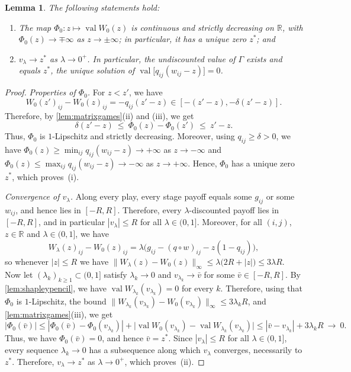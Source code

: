 \documentclass[11pt, a4paper]{article}
\theoremstyle{plain}
\newtheorem{lemma}{Lemma}
\theoremstyle{definition}
\newcommand{\R}{\mathbb{R}}
\DeclareMathOperator{\val}{val}
\begin{document}
\begin{lemma}\label{lem:uniformlimit}
The following statements hold:
\begin{enumerate}
\item[\emph{(i)}] The map $\Phi_0:z\mapsto\val W_0(z)$ is continuous and strictly decreasing on $\R$, with $\Phi_0(z)\to\mp\infty$ as $z\to\pm\infty$; in particular, it has a unique zero $z^*$; and
\item[\emph{(ii)}] $v_\lambda\to z^*$ as $\lambda\to0^+$. In particular, the undiscounted value of $\Gamma$ exists and equals $z^*$, the unique solution of $\val\bigl[q_{ij}(w_{ij}-z)\bigr]=0$.
\end{enumerate}
\end{lemma}

\begin{proof}
\emph{Properties of $\Phi_0$.}
For $z<z'$, we have
\[
W_0(z')_{ij}-W_0(z)_{ij}=-q_{ij}(z'-z)\in[-(z'-z),-\delta(z'-z)] .
\]
Therefore, by \cref{lem:matrixgames}(ii) and (iii), we get
\[
\delta(z'-z)\ \leq\ \Phi_0(z)-\Phi_0(z')\ \leq\ z'-z .
\]
Thus, $\Phi_0$ is $1$-Lipschitz and strictly decreasing.
Moreover, using $q_{ij}\geq\delta>0$, we have $\Phi_0(z)\geq\min_{ij}q_{ij}(w_{ij}-z)\to+\infty$ as $z\to-\infty$ and $\Phi_0(z)\leq\max_{ij}q_{ij}(w_{ij}-z)\to-\infty$ as $z\to+\infty$.
Hence, $\Phi_0$ has a unique zero $z^*$, which proves~(i).

\emph{Convergence of $v_\lambda$.}
Along every play, every stage payoff equals some $g_{ij}$ or some $w_{ij}$, and hence lies in $[-R,R]$.
Therefore, every $\lambda$-discounted payoff lies in $[-R,R]$, and in particular $|v_\lambda|\leq R$ for all $\lambda\in(0,1]$.
Moreover, for all $(i,j)$, $z\in\R$ and $\lambda\in(0,1]$, we have
\[
W_\lambda(z)_{ij}-W_0(z)_{ij}=\lambda\bigl(g_{ij}-(q\circ w)_{ij}-z(1-q_{ij})\bigr) ,
\]
so whenever $|z|\leq R$ we have $\|W_\lambda(z)-W_0(z)\|_\infty\leq\lambda\bigl(2R+|z|\bigr)\leq3\lambda R$.
Now let $(\lambda_k)_{k\geq1}\subset(0,1]$ satisfy $\lambda_k\to0$ and $v_{\lambda_k}\to\bar v$ for some $\bar v\in[-R,R]$.
By \cref{lem:shapleypencil}, we have $\val W_{\lambda_k}(v_{\lambda_k})=0$ for every $k$.
Therefore, using that $\Phi_0$ is $1$-Lipschitz, the bound $\|W_{\lambda_k}(v_{\lambda_k})-W_0(v_{\lambda_k})\|_\infty\leq3\lambda_k R$, and \cref{lem:matrixgames}(iii), we get
\[
|\Phi_0(\bar v)|
\leq|\Phi_0(\bar v)-\Phi_0(v_{\lambda_k})|
+\bigl|\val W_0(v_{\lambda_k})-\val W_{\lambda_k}(v_{\lambda_k})\bigr|
\leq|\bar v-v_{\lambda_k}|+3\lambda_kR\ \longrightarrow\ 0 .
\]
Thus, we have $\Phi_0(\bar v)=0$, and hence $\bar v=z^*$.
Since $|v_\lambda|\leq R$ for all $\lambda\in(0,1]$, every sequence $\lambda_k\to0$ has a subsequence along which $v_\lambda$ converges, necessarily to $z^*$.
Therefore, $v_\lambda\to z^*$ as $\lambda\to0^+$, which proves~(ii).
\end{proof}
\end{document}
